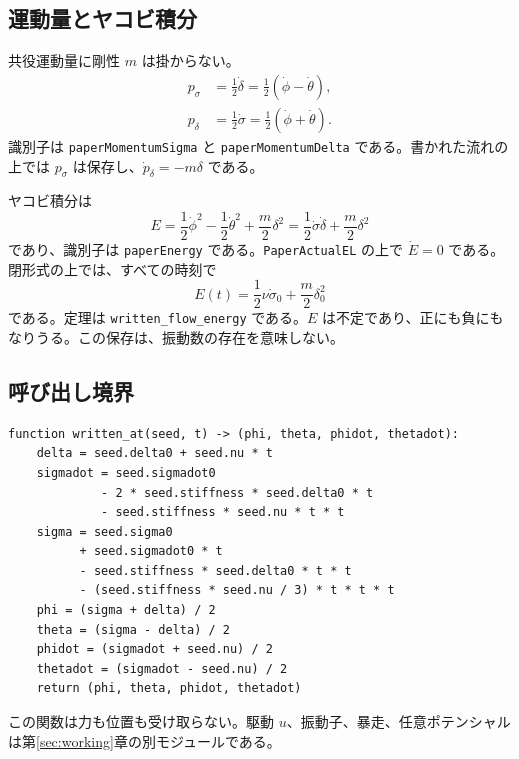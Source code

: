 \subsection{運動量とヤコビ積分}

共役運動量に剛性 \(m\) は掛からない。
\begin{align}
p_\sigma&=\frac12\dot\delta=\frac12(\dot\phi-\dot\theta),\\
p_\delta&=\frac12\dot\sigma=\frac12(\dot\phi+\dot\theta).
\end{align}
識別子は \texttt{paperMomentumSigma} と \texttt{paperMomentumDelta} である。書かれた流れの上では \(p_\sigma\) は保存し、\(\dot p_\delta=-m\delta\) である。

ヤコビ積分は
\[
E=\frac12\dot\phi^2-\frac12\dot\theta^2+\frac m2\delta^2
=\frac12\dot\sigma\dot\delta+\frac m2\delta^2
\]
であり、識別子は \texttt{paperEnergy} である。\texttt{PaperActualEL} の上で \(\dot E=0\) である。閉形式の上では、すべての時刻で
\[
E(t)=\frac12\nu\dot\sigma_0+\frac m2\delta_0^2
\]
である。定理は \texttt{written\_flow\_energy} である。\(E\) は不定であり、正にも負にもなりうる。この保存は、振動数の存在を意味しない。

\subsection{呼び出し境界}

\begin{verbatim}
function written_at(seed, t) -> (phi, theta, phidot, thetadot):
    delta = seed.delta0 + seed.nu * t
    sigmadot = seed.sigmadot0
             - 2 * seed.stiffness * seed.delta0 * t
             - seed.stiffness * seed.nu * t * t
    sigma = seed.sigma0
          + seed.sigmadot0 * t
          - seed.stiffness * seed.delta0 * t * t
          - (seed.stiffness * seed.nu / 3) * t * t * t
    phi = (sigma + delta) / 2
    theta = (sigma - delta) / 2
    phidot = (sigmadot + seed.nu) / 2
    thetadot = (sigmadot - seed.nu) / 2
    return (phi, theta, phidot, thetadot)
\end{verbatim}

この関数は力も位置も受け取らない。駆動 \(u\)、振動子、暴走、任意ポテンシャルは第\ref{sec:working}章の別モジュールである。
